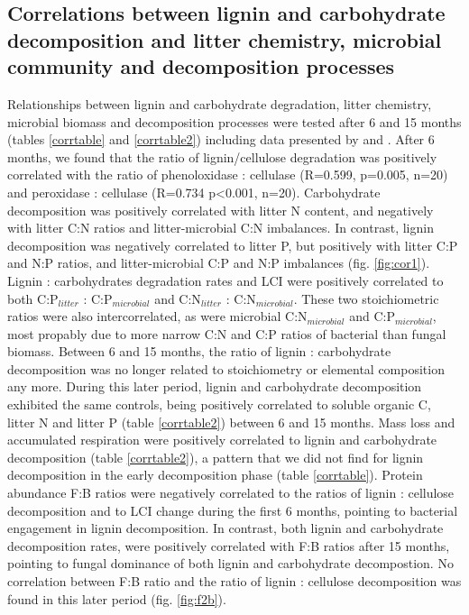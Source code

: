 \subsection*{Correlations between lignin and carbohydrate decomposition and litter chemistry, microbial community and decomposition processes}

Relationships between lignin and carbohydrate degradation, litter chemistry, microbial biomass and decomposition processes were tested after 6 and 15 months (tables \ref{corrtable} and \ref{corrtable2}) including data presented by \cite{Mooshammer2011} and \cite{Leitner2011}. After 6 months, we found that the ratio of lignin/cellulose degradation was positively correlated with the ratio of phenoloxidase : cellulase (R=0.599, p=0.005, n=20) and peroxidase : cellulase (R=0.734 p\textless 0.001, n=20). Carbohydrate decomposition was positively correlated with litter N content, and negatively with litter C:N ratios and litter-microbial C:N imbalances. In contrast, lignin decomposition was negatively correlated to litter P, but positively with litter C:P and N:P ratios, and litter-microbial C:P and N:P imbalances (fig. \ref{fig:cor1}). Lignin : carbohydrates degradation rates and LCI were positively correlated to both C:P$_{litter}$ : C:P$_{microbial}$ and C:N$_{litter}$ : C:N$_{microbial}$. These two stoichiometric ratios were also intercorrelated, as were microbial C:N$_{microbial}$ and C:P$_{microbial}$, most propably due to more narrow C:N and C:P ratios of bacterial than fungal biomass. Between 6 and 15 months, the ratio of lignin : carbohydrate decomposition was no longer related to stoichiometry or elemental composition any more. During this later period, lignin and carbohydrate decomposition exhibited the same controls, being positively correlated to soluble organic C, litter N and litter P (table \ref{corrtable2}) between 6 and 15 months. Mass loss and accumulated respiration were positively correlated to lignin and carbohydrate decomposition (table \ref{corrtable2}), a pattern that we did not find for lignin decomposition in the early decomposition phase (table \ref{corrtable}). Protein abundance F:B ratios were negatively correlated to the ratios of lignin : cellulose decomposition and to LCI change during the first 6 months, pointing to bacterial engagement in lignin decomposition. In contrast, both lignin and carbohydrate decomposition rates, were positively correlated with F:B ratios after 15 months, pointing to fungal dominance of both lignin and carbohydrate decompostion. No correlation between F:B ratio and the ratio of lignin : cellulose decomposition was found in this later period (fig. \ref{fig:f2b}).

